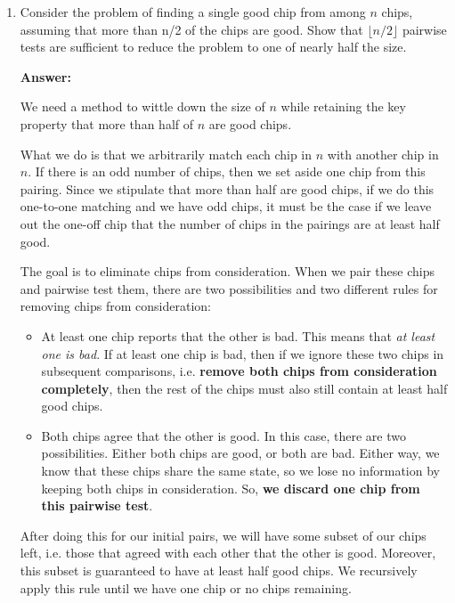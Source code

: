 \documentclass[]{book}
\theoremstyle{definition}
\begin{document}
\begin{enumerate}[label=\alph*.]
    \item Consider the problem of finding a single good chip from among $n$ chips,
          assuming that more than n/2 of the chips are good. Show that $\lfloor n/2 \rfloor$
          pairwise tests are sufficient to reduce the problem to one of nearly half the size.

    \textbf{Answer:}

        We need a method to wittle down the size of
        $n$ while retaining the key property that more than half of $n$ are good chips.

        What we do is that we arbitrarily match each chip in $n$ with another chip in $n$. If there
        is an odd number of chips, then we set aside one chip from this pairing. Since we stipulate
        that more than half are good chips, if we do this one-to-one matching and we have odd chips,
        it must be the case if we leave out the one-off chip that the number of chips in
        the pairings are at least half good.

        The goal is to eliminate chips from consideration.
        When we pair these chips and pairwise test them, there are two possibilities
        and two different rules for removing chips from consideration:
        \begin{itemize}
            \item At least one chip reports that the other is bad.
            This means that \textit{at least one is bad}. If at least one
            chip is bad, then if we ignore these two chips in subsequent comparisons, i.e.
            \textbf{remove both chips from consideration completely}, then the rest of the chips must
            also still contain at least half good chips.

            \item Both chips agree that the other is good. In this case, there are two possibilities.
            Either both chips are good, or both are bad. Either way, we know that these chips share
            the same state, so we lose no information by keeping both chips in consideration.
            So, \textbf{we discard one chip from this pairwise test}.
        \end{itemize} 

        After doing this for our initial pairs, we will have some subset of our chips left, i.e.
        those that agreed with each other that the other is good. Moreover, this subset is
        guaranteed to have at least half good chips. We recursively apply this rule until
        we have one chip or no chips remaining.
        

\end{enumerate}
\end{document}

